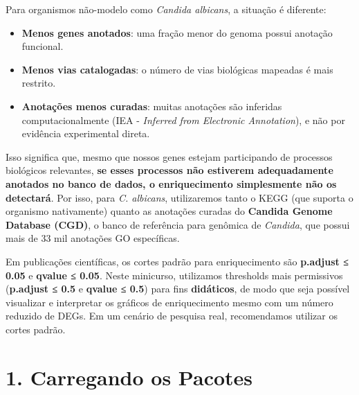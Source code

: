 \documentclass[
  letterpaper,
  DIV=11,
  numbers=noendperiod]{scrreprt}
\providecommand{\tightlist}{%
  \setlength{\itemsep}{0pt}\setlength{\parskip}{0pt}}
\begin{document}
Para organismos não-modelo como \emph{Candida albicans}, a situação é
diferente:

\begin{itemize}
\tightlist
\item
  \textbf{Menos genes anotados}: uma fração menor do genoma possui
  anotação funcional.
\item
  \textbf{Menos vias catalogadas}: o número de vias biológicas mapeadas
  é mais restrito.
\item
  \textbf{Anotações menos curadas}: muitas anotações são inferidas
  computacionalmente (IEA - \emph{Inferred from Electronic Annotation}),
  e não por evidência experimental direta.
\end{itemize}

Isso significa que, mesmo que nossos genes estejam participando de
processos biológicos relevantes, \textbf{se esses processos não
estiverem adequadamente anotados no banco de dados, o enriquecimento
simplesmente não os detectará}. Por isso, para \emph{C. albicans},
utilizaremos tanto o KEGG (que suporta o organismo nativamente) quanto
as anotações curadas do \textbf{Candida Genome Database (CGD)}, o banco
de referência para genômica de \emph{Candida}, que possui mais de 33 mil
anotações GO específicas.

\begin{tcolorbox}[enhanced jigsaw, arc=.35mm, bottomrule=.15mm, bottomtitle=1mm, breakable, colback=white, colbacktitle=quarto-callout-warning-color!10!white, colframe=quarto-callout-warning-color-frame, coltitle=black, left=2mm, leftrule=.75mm, opacityback=0, opacitybacktitle=0.6, rightrule=.15mm, title=\textcolor{quarto-callout-warning-color}{\faExclamationTriangle}\hspace{0.5em}{Nota Didática --- Thresholds Relaxados}, titlerule=0mm, toprule=.15mm, toptitle=1mm]

Em publicações científicas, os cortes padrão para enriquecimento são
\textbf{p.adjust ≤ 0.05} e \textbf{qvalue ≤ 0.05}. Neste minicurso,
utilizamos thresholds mais permissivos (\textbf{p.adjust ≤ 0.5} e
\textbf{qvalue ≤ 0.5}) para fins \textbf{didáticos}, de modo que seja
possível visualizar e interpretar os gráficos de enriquecimento mesmo
com um número reduzido de DEGs. Em um cenário de pesquisa real,
recomendamos utilizar os cortes padrão.

\end{tcolorbox}

\section{1. Carregando os Pacotes}\label{carregando-os-pacotes-1}
\end{document}
